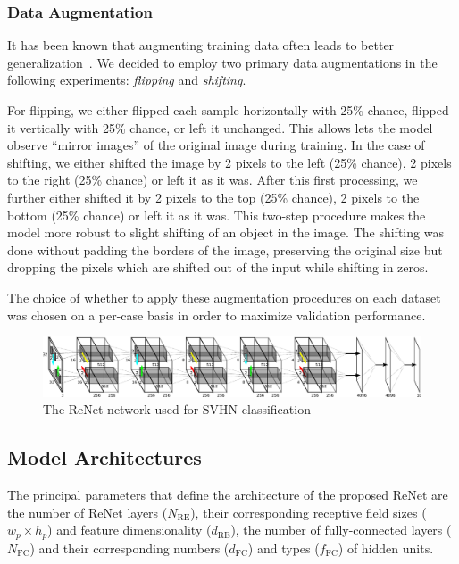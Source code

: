 \subsubsection{Data Augmentation}

It has been known that augmenting training data often leads to better
generalization~\citep[see, e.g.,][]{Krizhevsky-2012}. We decided to employ
two primary data augmentations in the following experiments: {\it flipping} and
{\it shifting}.

For flipping, we either flipped each sample horizontally with 25\% chance,
flipped it vertically with 25\% chance, or left it unchanged. This allows lets
the model observe ``mirror images'' of the original image during training.
In the case of shifting, we either shifted the image by 2 pixels to the left
(25\% chance), 2 pixels to the right (25\% chance) or left it as it was. After
this first processing, we further either shifted it by 2 pixels to the top
(25\% chance), 2 pixels to the bottom (25\% chance) or left it as it was. This
two-step procedure makes the model more robust to slight shifting of an object
in the image. The shifting was done without padding the borders of the image,
preserving the original size but dropping the pixels which are shifted out of
the input while shifting in zeros.

The choice of whether to apply these augmentation procedures on each dataset was
chosen on a per-case basis in order to maximize validation performance.

\begin{figure}[t]
    \centering
    \includegraphics[height=.135\textheight,width=\columnwidth]{pdf/renet_svhn.pdf}
    \caption{The ReNet network used for SVHN classification}
    \label{fig:network}
\end{figure}

\subsection{Model Architectures}

The principal parameters that define the architecture of the proposed ReNet are
the number of ReNet layers ($N_{\text{RE}}$), their corresponding receptive field
sizes ($w_p \times h_p$) and feature dimensionality ($d_{\text{RE}}$),
the number of fully-connected layers ($N_{\text{FC}}$) and their corresponding
numbers ($d_{\text{FC}}$) and types ($f_{\text{FC}}$) of hidden units.

